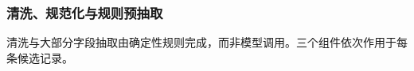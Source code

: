 \documentclass[11pt]{article}
\begin{document}
\subsubsection{{\cjkfont 清\allowbreak 洗\allowbreak 、\allowbreak 规\allowbreak 范\allowbreak 化\allowbreak 与\allowbreak 规\allowbreak 则\allowbreak 预\allowbreak 抽\allowbreak 取}}
{\cjkfont 清\allowbreak 洗\allowbreak 与\allowbreak 大\allowbreak 部\allowbreak 分\allowbreak 字\allowbreak 段\allowbreak 抽\allowbreak 取\allowbreak 由\allowbreak 确\allowbreak 定\allowbreak 性\allowbreak 规\allowbreak 则\allowbreak 完\allowbreak 成\allowbreak ，\allowbreak 而\allowbreak 非\allowbreak 模\allowbreak 型\allowbreak 调\allowbreak 用\allowbreak 。\allowbreak 三\allowbreak 个\allowbreak 组\allowbreak 件\allowbreak 依\allowbreak 次\allowbreak 作\allowbreak 用\allowbreak 于\allowbreak 每\allowbreak 条\allowbreak 候\allowbreak 选\allowbreak 记\allowbreak 录\allowbreak 。}
\end{document}
